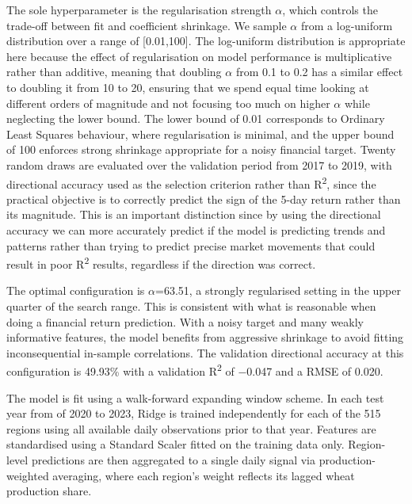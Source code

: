\documentclass[pdflatex,sn-mathphys-num, oneside]{sn-jnl}%
\theoremstyle{thmstyleone}%
\theoremstyle{thmstyletwo}%
\theoremstyle{thmstylethree}%
\begin{document}
The sole hyperparameter is the regularisation strength $\alpha$, which controls the trade-off between fit and coefficient shrinkage. We sample $\alpha$ from a log-uniform distribution over a range of [0.01,100]. The log-uniform distribution is appropriate here because the effect of regularisation on model performance is multiplicative rather than additive, meaning that doubling $\alpha$ from 0.1 to 0.2 has a similar effect to doubling it from 10 to 20, ensuring that we spend equal time looking at different orders of magnitude and not focusing too much on higher $\alpha$ while neglecting the lower bound. The lower bound of 0.01 corresponds to Ordinary Least Squares behaviour, where regularisation is minimal, and the upper bound of 100 enforces strong shrinkage appropriate for a noisy financial target. Twenty random draws are evaluated over the validation period from 2017 to 2019, with directional accuracy used as the selection criterion rather than R\textsuperscript{2}, since the practical objective is to correctly predict the sign of the 5-day return rather than its magnitude. This is an important distinction since by using the directional accuracy we can more accurately predict if the model is predicting trends and patterns rather than trying to predict precise market movements that could result in poor R\textsuperscript{2} results, regardless if the direction was correct.

The optimal configuration is $\alpha$=63.51, a strongly regularised setting in the upper quarter of the search range. This is consistent with what is reasonable when doing a financial return prediction. With a noisy target and many weakly informative features, the model benefits from aggressive shrinkage to avoid fitting inconsequential in-sample correlations. The validation directional accuracy at this configuration is 49.93\% with a validation R\textsuperscript{2} of −0.047 and a RMSE of 0.020.

The model is fit using a walk-forward expanding window scheme. In each test year from of 2020 to 2023, Ridge is trained independently for each of the 515 regions using all available daily observations prior to that year. Features are standardised using a Standard Scaler fitted on the training data only. Region-level predictions are then aggregated to a single daily signal via production-weighted averaging, where each region's weight reflects its lagged wheat production share.
\end{document}
